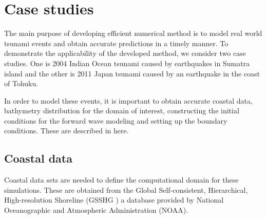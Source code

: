 \section{Case studies}
The main purpose of developing efficient numerical method is to model real
world tsunami events and obtain accurate predictions in a timely manner. To demonstrate the applicability of the developed method, we consider two case studies. One is 2004 Indian Ocean tsunami caused by earthquakes in Sumatra island and the other is 2011 Japan tsunami caused by an earthquake in the coast of Tohuku. 

In order to model these events, it is important to obtain  accurate coastal
data, bathymetry distribution for the domain of interest, constructing the initial conditions for the forward wave modeling and setting up the boundary conditions. These are described in here.   
\label{sec:datasets}
 
\subsection{Coastal data}
Coastal data sets are needed to define the computational domain for these simulations. These are obtained from the Global Self-consistent, Hierarchical, High-resolution Shoreline (GSSHG  \cite{wessel2013gshhg}) a database provided by National Oceanographic and Atmospheric Administration (NOAA). 

